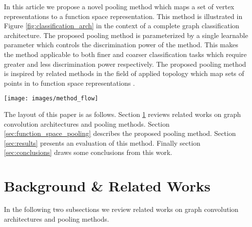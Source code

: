 \documentclass[runningheads]{llncs}
\begin{document}
In this article we propose a novel pooling method which maps a set of vertex representations to a function space representation. This method is illustrated in Figure \ref{fig:classification_arch} in the context of a complete graph classification architecture. The proposed pooling method is parameterized by a single learnable parameter which controls the discrimination power of the method. This makes the method applicable to both finer and coarser classification tasks which require greater and less discrimination power respectively. The proposed pooling method is inspired by related methods in the field of applied topology which map sets of points in  to function space representations \cite{adams2017}.

\begin{figure*}
\begin{center}
\texttt{[image: images/method\_flow]}
\caption{The proposed pooling method is illustrated in the context of a complete graph classification architecture. The input graph is first fed to a sequence of graph convolutional layers which outputs a set of vertex representations. The number of elements in this set equals the number of vertices in the original graph. This set is next mapped to a function space representation. This function space representation is then fed to a feed-forward architecture which outputs a predicted graph class.}
\label{fig:classification_arch}
\end{center}
\end{figure*}

The layout of this paper is as follows. Section \ref{sec:related_works} reviews related works on graph convolution architectures and pooling methods. Section \ref{sec:function_space_pooling} describes the proposed pooling method. Section \ref{sec:results} presents an evaluation of this method. Finally section \ref{sec:conclusions} draws some conclusions from this work.

\section{Background \& Related Works}
\label{sec:related_works}
In the following two subsections we review related works on graph convolution architectures and pooling methods.
\end{document}
